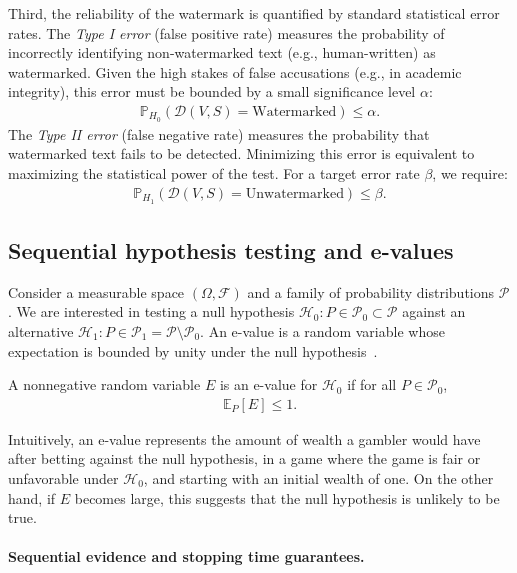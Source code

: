 Third, the reliability of the watermark is quantified by standard statistical error rates.
The \emph{Type I error} (false positive rate) measures the probability of incorrectly identifying non-watermarked text (e.g., human-written) as watermarked. Given the high stakes of false accusations (e.g., in academic integrity), this error must be bounded by a small significance level $\alpha$:
\begin{align*}
    \mathbb{P}_{H_0}(\mathcal{D}(V, S) = \text{Watermarked}) \leq \alpha.
\end{align*}
The \emph{Type II error} (false negative rate) measures the probability that watermarked text fails to be detected. Minimizing this error is equivalent to maximizing the statistical power of the test. For a target error rate $\beta$, we require:
\begin{align*}
    \mathbb{P}_{H_1}(\mathcal{D}(V, S) = \text{Unwatermarked}) \leq \beta.
\end{align*}


\subsection{Sequential hypothesis testing and e-values}

Consider a measurable space $(\Omega, \mathcal{F})$ and a family of probability distributions $\mathcal{P}$. We are interested in testing a null hypothesis $\mathcal{H}_0: P \in \mathcal{P}_0 \subset \mathcal{P}$ against an alternative $\mathcal{H}_1: P \in \mathcal{P}_1 = \mathcal{P} \setminus \mathcal{P}_0$. 
An e-value is a random variable whose expectation is bounded by unity under the null hypothesis~\citep{vovk2021values}.

\begin{definition}[E-value]
A nonnegative random variable $E$ is an e-value for $\mathcal{H}_0$ if for all $P \in \mathcal{P}_0$,
\begin{align*}
    \mathbb{E}_P[E] \le 1.
\end{align*}
\end{definition}

Intuitively, an e-value represents the amount of wealth a gambler would have after betting against the null hypothesis, in a game where the game is fair or unfavorable under $\mathcal{H}_0$, and starting with an initial wealth of one. On the other hand, if $E$ becomes large, this suggests that the null hypothesis is unlikely to be true.

\paragraph{Sequential evidence and stopping time guarantees.}

